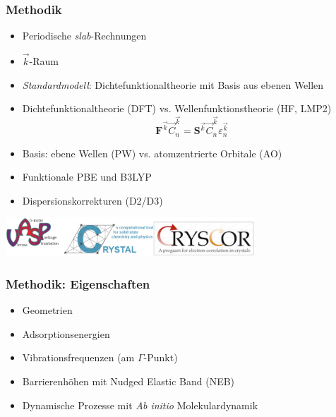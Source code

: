 \documentclass[hyperref={pdfpagelabels=false}]{beamer}
\begin{document}
\begin{frame}
 \frametitle{Methodik}
 \begin{itemize}
  \item Periodische \textit{slab}-Rechnungen
  \item $\vec{k}$-Raum
  \item \textit{Standardmodell}: Dichtefunktionaltheorie mit Basis aus ebenen Wellen
  \item Dichtefunktionaltheorie (DFT) vs. Wellenfunktionstheorie (HF, LMP2)
  $$\textbf{F}^{\vec{k}}\vec{C}^{\vec{k}}_n=\textbf{S}{^\vec{k}}\vec{C}_n^{\vec{k}}\varepsilon_n^{\vec{k}}$$
  \pause
  \item Basis: ebene Wellen (PW) vs. atomzentrierte Orbitale (AO)
  \item Funktionale PBE und B3LYP
  \item Dispersionskorrekturen (D2/D3)
 \end{itemize}

 \centering
 \includegraphics[width=0.7\textwidth]{figures/programs-logos.eps}
\end{frame}


\begin{frame}
\frametitle{Methodik: Eigenschaften}
\begin{itemize}
\item Geometrien
\item Adsorptionsenergien
\item Vibrationsfrequenzen (am $\Gamma$-Punkt)
\item Barrierenhöhen mit Nudged Elastic Band (NEB)
\item Dynamische Prozesse mit \textit{Ab initio} Molekulardynamik
\end{itemize}
\end{frame}
\end{document}
